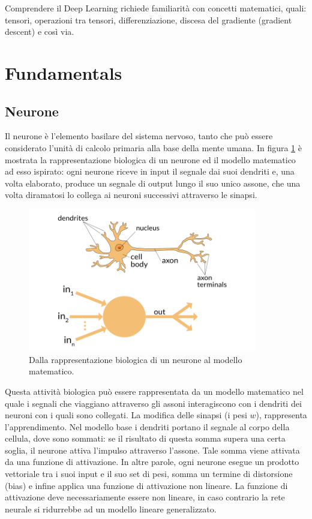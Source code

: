 


Comprendere il Deep Learning richiede familiarità con concetti matematici, quali: tensori, operazioni tra tensori, differenziazione, discesa del gradiente (gradient descent) e così via.

\section{Fundamentals}


\subsection{Neurone}
Il neurone è l'elemento basilare del sistema nervoso, tanto che può essere considerato l'unità di calcolo primaria alla base della mente umana. In figura \ref{img:neurone} è mostrata la rappresentazione biologica di un neurone ed il modello matematico ad esso ispirato: ogni neurone riceve in input il segnale dai suoi dendriti e, una volta elaborato, produce un segnale di output lungo il suo unico assone, che una volta diramatosi lo collega ai neuroni successivi attraverso le sinapsi.

\begin{figure}[htb]
	\centering
	\includegraphics[width = 100mm]{images/neuron.png}
	\caption{Dalla rappresentazione biologica di un neurone al modello matematico.}
	\label{img:neurone}
\end{figure}

Questa attività biologica può essere rappresentata da un modello matematico nel quale i segnali che viaggiano attraverso gli assoni interagiscono con i dendriti dei neuroni con i quali sono collegati. La modifica delle sinapsi (i pesi $w$), rappresenta l'apprendimento. Nel modello base i dendriti portano il segnale al corpo della cellula, dove sono sommati: se il risultato di questa somma supera una certa soglia, il neurone attiva l'impulso attraverso l'assone. Tale somma viene attivata da una funzione di attivazione. In altre parole, ogni neurone esegue un prodotto vettoriale tra i suoi input e il suo set di pesi, somma un termine di distorsione (bias) e infine applica una funzione di attivazione non lineare. La funzione di attivazione deve necessariamente essere non lineare, in caso contrario la rete neurale si ridurrebbe ad un modello lineare generalizzato.

